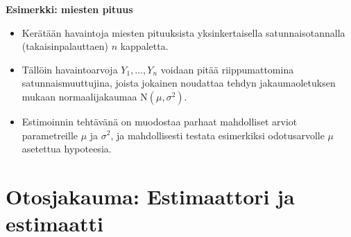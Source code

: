 \documentclass[
]{book}
\begin{document}
\begin{eblock}{}

\textbf{Esimerkki: miesten pituus}

\begin{itemize}
\item
  Kerätään havaintoja miesten pituuksista yksinkertaisella satunnaisotannalla (takaisinpalauttaen) \(n\) kappaletta.
\item
  Tällöin havaintoarvoja \(Y_1, \ldots, Y_n\) voidaan pitää riippumattomina satunnaismuuttujina, joista jokainen noudattaa tehdyn jakaumaoletuksen mukaan normaalijakaumaa \(\text{N}(\mu, \sigma^2)\).
\item
  Estimoinnin tehtävänä on muodostaa parhaat mahdolliset arviot parametreille \(\mu\) ja \(\sigma^2\), ja mahdollisesti testata esimerkiksi odotusarvolle \(\mu\) asetettua hypoteesia.
\end{itemize}

\end{eblock}

\hypertarget{alaluku92}{%
\section{Otosjakauma: Estimaattori ja estimaatti}\label{alaluku92}}
\end{document}
